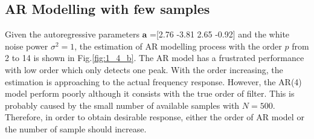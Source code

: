 \subsection{AR Modelling with few samples}
Given the autoregressive parameters $\mathbf a$ =[2.76 -3.81 2.65 -0.92] and the white noise power $\sigma^2=1$, the estimation of AR modelling process with the order $p$ from 2 to 14 is shown in Fig.\ref{fig:1_4_b}. The AR model has a frustrated performance with low order which only detects one peak. With the order increasing, the estimation is approaching to the actual frequency response. However, the AR(4) model perform poorly although it consists with the true order of filter. This is probably caused by the small number of available samples with $N=500$. Therefore, in order to obtain desirable response, either the order of AR model or the number of sample should increase. 
